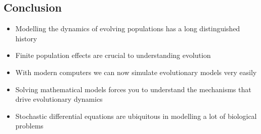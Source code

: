 
\begin{slide}
\section{Conclusion}

\begin{PauseHighLight}
  \begin{itemize}
  \item Modelling the dynamics of evolving populations has a long
    distinguished history\pause
  \item Finite population effects are crucial to understanding
    evolution\pause
  \item With modern computers we can now simulate evolutionary models
    very easily\pause
  \item Solving mathematical models forces you to understand the
    mechanisms that drive evolutionary dynamics\pause
  \item Stochastic differential equations are ubiquitous in modelling a
    lot of biological problems\pause
  \end{itemize}
\end{PauseHighLight}

\end{slide}


